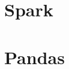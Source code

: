 
\begin{apendicesenv}

\partapendices

\chapter{Spark}
\lipsum[30]

\chapter{Pandas}

\lipsum[31]

\end{apendicesenv}
